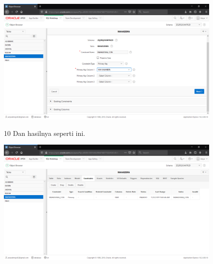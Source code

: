 \begin{enumerate}
\begin{figure}
    \begin{center}
\includegraphics[scale=0.2]{figures/21.png}
    \caption{\textit{}}
        \end{center}
\label{gambar}
\end{figure}

\begin{figure}
\item[10]Dan hasilnya seperti ini.

    \begin{center}
\includegraphics[scale=0.2]{figures/22.png}
    \caption{\textit{}}
        \end{center}
\label{gambar}
\end{figure}


\end{enumerate}
